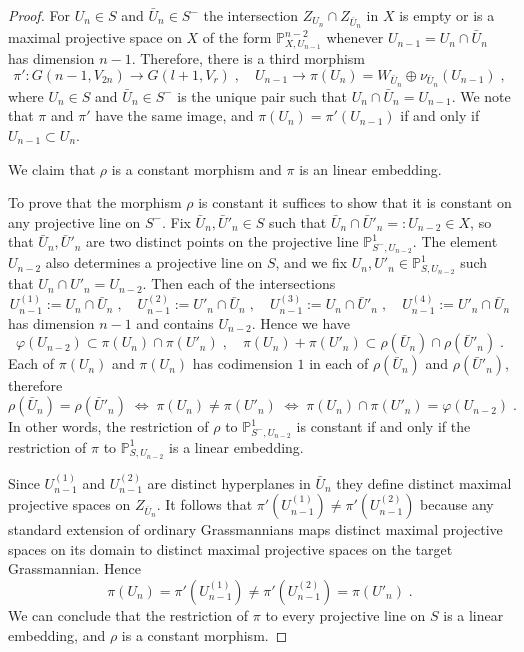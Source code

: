 \documentclass[12pt]{amsart}
\def\PP {{\mathbb P}}     %
\def\tst {\Longleftrightarrow}
\begin{document}
\begin{proof}
For $U_n\in S$ and $\bar U_n\in S^-$ the intersection $Z_{U_n}\cap Z_{\bar U_n}$ in $X$ is empty or is a maximal projective space on $X$ of the form $\PP^{n-2}_{X,U_{n-1}}$ whenever $U_{n-1}=U_n\cap\bar U_n$ has dimension $n-1$. Therefore, there is a third morphism
$$
\pi': G(n-1,V_{2n}) \to G(l+1,V_r) \;,\quad U_{n-1}\to \pi(U_n)=W_{\bar U_n}\oplus \nu_{\bar U_n}(U_{n-1}) \;,
$$
where $U_n\in S$ and $\bar U_n\in S^-$ is the unique pair such that $U_n\cap \bar U_n=U_{n-1}$. We note that $\pi$ and $\pi'$ have the same image, and $\pi(U_n)=\pi'(U_{n-1})$ if and only if $U_{n-1}\subset U_n$.

We claim that $\rho$ is a constant morphism and $\pi$ is an linear embedding. 

To prove that the morphism $\rho$ is constant it suffices to show that it is constant on any projective line on $S^-$. Fix $\bar U_n,\bar U'_n\in S$ such that $\bar U_n\cap \bar U'_n=:U_{n-2}\in X$, so that $\bar U_n,\bar U'_n$ are two distinct points on the projective line $\PP^{1}_{S^-,U_{n-2}}$. The element $U_{n-2}$ also determines a projective line on $S$, and we fix $U_n,U'_{n}\in \PP^1_{S,U_{n-2}}$ such that $U_n\cap U'_n=U_{n-2}$. Then each of the intersections 
$$
U^{(1)}_{n-1}:=U_n\cap \bar U_n \;,\quad U^{(2)}_{n-1}:=U'_n\cap \bar U_n \;,\quad U^{(3)}_{n-1}:=U_n\cap \bar U'_n \;,\quad U^{(4)}_{n-1}:=U'_n\cap \bar U_n
$$
has dimension $n-1$ and contains $U_{n-2}$. Hence we have
$$
\varphi(U_{n-2})\subset  \pi(U_n)\cap \pi(U'_n) \;,\quad  \pi(U_n)+\pi(U'_n)\subset \rho(\bar U_n)\cap \rho(\bar U'_n) \;.
$$
Each of $\pi(U_n)$ and $\pi(U_n)$ has codimension $1$ in each of $\rho(\bar U_n)$ and $\rho(\bar U'_n)$, therefore
$$
\rho(\bar U_n)= \rho(\bar U'_n) \;\tst\; \pi(U_n)\ne \pi(U'_n) \;\tst\; \pi(U_n)\cap \pi(U'_n)=\varphi(U_{n-2}) \;.
$$
In other words, the restriction of $\rho$ to $\PP^1_{S^-,U_{n-2}}$ is constant if and only if the restriction of $\pi$ to $\PP^1_{S,U_{n-2}}$ is a linear embedding.

Since $U^{(1)}_{n-1}$ and $U^{(2)}_{n-1}$ are distinct hyperplanes in $\bar U_{n}$ they define distinct maximal projective spaces on $Z_{\bar U_n}$. It follows that $\pi'(U^{(1)}_{n-1}) \ne  \pi'(U^{(2)}_{n-1})$ because any standard extension of ordinary Grassmannians maps distinct maximal projective spaces on its domain to distinct maximal projective spaces on the target Grassmannian. Hence
$$
\pi(U_n)=\pi'(U^{(1)}_{n-1}) \ne  \pi'(U^{(2)}_{n-1}) = \pi(U'_n) \;.
$$
We can conclude that the restriction of $\pi$ to every projective line on $S$ is a linear embedding, and $\rho$ is a constant morphism.


\end{proof}
\end{document}
